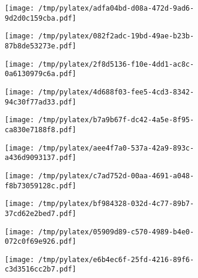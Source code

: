 \documentclass{article}
\begin{document}
\begin{figure}[htbp]
\begin{subfigure}[b]{.3\linewidth}
\texttt{[image: /tmp/pylatex/adfa04bd-d08a-472d-9ad6-9d2d0c159cba.pdf]}
\end{subfigure}
\begin{subfigure}[b]{.3\linewidth}
\texttt{[image: /tmp/pylatex/082f2adc-19bd-49ae-b23b-87b8de53273e.pdf]}
\end{subfigure}
\begin{subfigure}[b]{.3\linewidth}
\texttt{[image: /tmp/pylatex/2f8d5136-f10e-4dd1-ac8c-0a6130979c6a.pdf]}
\end{subfigure}
\begin{subfigure}[b]{.3\linewidth}
\texttt{[image: /tmp/pylatex/4d688f03-fee5-4cd3-8342-94c30f77ad33.pdf]}
\end{subfigure}
\begin{subfigure}[b]{.3\linewidth}
\texttt{[image: /tmp/pylatex/b7a9b67f-dc42-4a5e-8f95-ca830e7188f8.pdf]}
\end{subfigure}
\begin{subfigure}[b]{.3\linewidth}
\texttt{[image: /tmp/pylatex/aee4f7a0-537a-42a9-893c-a436d9093137.pdf]}
\end{subfigure}
\begin{subfigure}[b]{.3\linewidth}
\texttt{[image: /tmp/pylatex/c7ad752d-00aa-4691-a048-f8b73059128c.pdf]}
\end{subfigure}
\begin{subfigure}[b]{.3\linewidth}
\texttt{[image: /tmp/pylatex/bf984328-032d-4c77-89b7-37cd62e2bed7.pdf]}
\end{subfigure}
\begin{subfigure}[b]{.3\linewidth}
\texttt{[image: /tmp/pylatex/05909d89-c570-4989-b4e0-072c0f69e926.pdf]}
\end{subfigure}
\begin{subfigure}[b]{.3\linewidth}
\texttt{[image: /tmp/pylatex/e6b4ec6f-25fd-4216-89f6-c3d3516cc2b7.pdf]}
\end{subfigure}
\end{figure}
\end{document}

